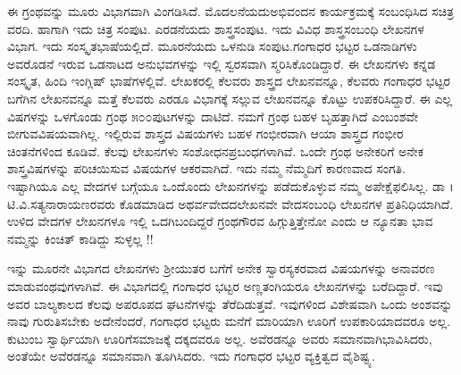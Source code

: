 {ಈ ಗ್ರಂಥವನ್ನು ಮೂರು ವಿಭಾಗವಾಗಿ ವಿಂಗಡಿಸಿದೆ. ಮೊದಲನೆಯದು\break ಅಭಿವಂದನ ಕಾರ್ಯಕ್ರಮಕ್ಕೆ ಸಂಬಂಧಿಸಿದ ಸಚಿತ್ರ ವರದಿ. ಹಾಗಾಗಿ ಇದು ಚಿತ್ರ ಸಂಪುಟ. ಎರಡನೆಯದು ಶಾಸ್ತ್ರಸಂಪುಟ. ಇದು ವಿವಿಧ ಶಾಸ್ತ್ರಸಂಬಂಧಿ ಲೇಖನಗಳ ವಿಭಾಗ. ಇದು ಸಂಸ್ಕೃತಭಾಷೆಯಲ್ಲಿದೆ. ಮೂರನೆಯದು  ಒಳನುಡಿ ಸಂಪುಟ.\break ಗಂಗಾಧರ ಭಟ್ಟರ ಒಡನಾಡಿಗಳು ಅವರೊಡನೆ ಇರುವ ಒಡನಾಟದ ಅನುಭವಗಳನ್ನು ಇಲ್ಲಿ ಸ್ವರಸವಾಗಿ ಸ್ಮರಿಸಿಕೊಂಡಿದ್ದಾರೆ. ಈ ಲೇಖನಗಳು ಕನ್ನಡ ಸಂಸ್ಕೃತ, ಹಿಂದಿ ಇಂಗ್ಲಿಷ್ ಭಾಷೆಗಳಲ್ಲಿವೆ. ಲೇಖಕರಲ್ಲಿ ಕೆಲವರು ಶಾಸ್ತ್ರದ ಲೇಖನವನ್ನೂ, ಕೆಲವರು ಗಂಗಾಧರ ಭಟ್ಟರ ಬಗೆಗಿನ ಲೇಖನವನ್ನೂ ಮತ್ತೆ ಕೆಲವರು ಎರಡೂ ವಿಭಾಗಕ್ಕೆ ಸಲ್ಲುವ ಲೇಖನ\-ವನ್ನೂ ಕೊಟ್ಟು ಉಪಕರಿಸಿದ್ದಾರೆ. ಈ ಎಲ್ಲ ವಿಷಗಳನ್ನು ಒಳಗೊಂಡು ಗ್ರಂಥ ೫೦೦ಪುಟ\-ಗಳನ್ನು ದಾಟಿದೆ. ನಮಗೆ ಗ್ರಂಥ ಬಹಳ ಬೃಹತ್ತಾಗಿದೆ ಎಂಬಂಶವೇ ಬೀಗುವ\break ವಿಷಯವಾಗಿಲ್ಲ. ಇಲ್ಲಿರುವ ಶಾಸ್ತ್ರದ ವಿಷಯಗಳು ಬಹಳ ಗಂಭೀರವಾಗಿ ಆಯಾ ಶಾಸ್ತ್ರದ ಗಂಭೀರ ಚಿಂತನೆಗಳಿಂದ ಕೂಡಿವೆ. ಕೆಲವು ಲೇಖನಗಳು ಸಂಶೋಧನ\break ಪ್ರಬಂಧಗಳಾಗಿವೆ. ಒಂದೇ ಗ್ರಂಥ ಅನೇಕರಿಗೆ ಅನೇಕ ಶಾಸ್ತ್ರವಿಷಗಳನ್ನು ಪರಿಚಯಿಸುವ ವಿಷಯಗಳ ಆಕರವಾಗಿದೆ. ಇದು ನಮ್ಮ ನೆಮ್ಮದಿಗೆ ಕಾರಣವಾದ ಸಂಗತಿ. ಇಷ್ಟಾಗಿಯೂ ಎಲ್ಲ ವೇದಗಳ ಬಗ್ಗೆಯೂ ಒಂದೊಂದು ಲೇಖನಗಳನ್ನು ಪಡೆದುಕೊಳ್ಳುವ ನಮ್ಮ ಅಪೇಕ್ಷೆ\break ಫಲಿಸಿಲ್ಲ. ಡಾ  । ಟಿ.ವಿ.ಸತ್ಯನಾರಾಯಣರವರು ಕೊಡಮಾಡಿದ ಅಥರ್ವವೇದದ\break ಲೇಖನವೇ ವೇದಸಂಬಂಧಿ ಲೇಖನಗಳ ಪ್ರತಿನಿಧಿಯಾಗಿದೆ. ಉಳಿದ ವೇದಗಳ ಲೇಖನಗಳೂ ಇಲ್ಲಿ ಒದಗಿಬಂದಿದ್ದರೆ ಗ್ರಂಥಗೌರವ ಹಿಗ್ಗುತ್ತಿತ್ತೇನೋ ಎಂದು ಆ ನ್ಯೂನತಾ ಭಾವ ನಮ್ಮನ್ನು ಕಿಂಚಿತ್ ಕಾಡಿದ್ದು ಸುಳ್ಳಲ್ಲ !!  

ಇನ್ನು ಮೂರನೇ ವಿಭಾಗದ ಲೇಖನಗಳು ಶ್ರೀಯುತರ ಬಗೆಗೆ ಅನೇಕ ಸ್ವಾರಸ್ಯಕರ\-ವಾದ ವಿಷಯಗಳನ್ನು ಅನಾವರಣ ಮಾಡುವಂಥವುಗಳಾಗಿವೆ. ಈ ವಿಭಾಗದಲ್ಲಿ ಗಂಗಾಧರ ಭಟ್ಟರ ಅಣ್ಣತಂಗಿಯರೂ ಲೇಖನಗಳನ್ನು ಬರೆದಿದ್ದಾರೆ. ಇವು ಅವರ ಬಾಲ್ಯಕಾಲದ ಕೆಲವು ಅಪರೂಪದ ಘಟನೆಗಳನ್ನು ತೆರೆದಿಡುತ್ತವೆ. ಇವುಗಳಿಂದ ವಿಶೇಷವಾಗಿ ಒಂದು ಅಂಶವನ್ನು ನಾವು ಗುರುತಿಸಬೇಕು \enginline{-} ಅದೇನೆಂದರೆ, ಗಂಗಾಧರ ಭಟ್ಟರು ಮನೆಗೆ ಮಾರಿಯಾಗಿ ಊರಿಗೆ ಉಪಕಾರಿಯಾದವರೂ ಅಲ್ಲ. ಕುಟುಂಬ ಸ್ವಾರ್ಥಿಯಾಗಿ ಊರಿಗೆ\enginline{-}ಸಮಾಜಕ್ಕೆ ದಕ್ಕದವರೂ ಅಲ್ಲ. ಅವೆರಡನ್ನೂ ಅವರು ಸಮಾನವಾಗಿ\break ಭಾವಿಸಿದರು, ಅಂತೆಯೇ ಅವೆರಡನ್ನೂ ಸಮಾನವಾಗಿ ತೂಗಿಸಿದರು. ಇದು ಗಂಗಾಧರ ಭಟ್ಟರ ವ್ಯಕ್ತಿತ್ವದ ವೈಶಿಷ್ಟ್ಯ.

}
